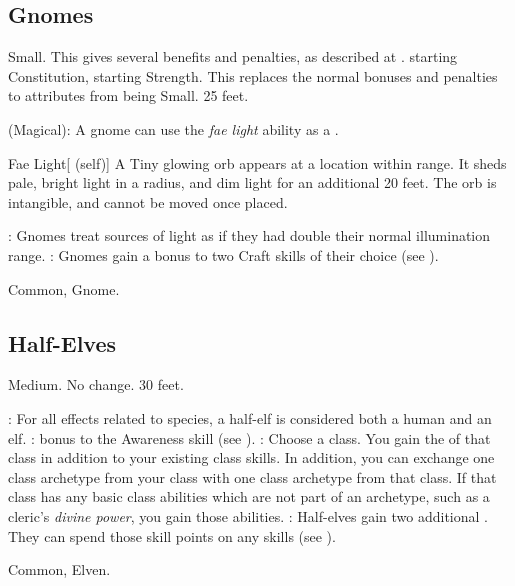 \subsection{Gnomes}
 Small. This gives several benefits and penalties, as described at .
  starting Constitution,  starting Strength. This replaces the normal bonuses and penalties to attributes from being Small.
 25 feet.
\begin{itemize}
     (Magical): A gnome can use the \textit{fae light} ability as a .
        \begin{attuneability}{Fae Light}[ (self)]
            A Tiny glowing orb appears at a location within \rngmed range.
            It sheds pale, bright light in a \areamed radius, and dim light for an additional 20 feet.
            The orb is intangible, and cannot be moved once placed.
        \end{attuneability}
    : Gnomes treat sources of light as if they had double their normal illumination range.
    : Gnomes gain a  bonus to two Craft skills of their choice (see ).
\end{itemize}
 Common, Gnome.

\subsection{Half-Elves}\label{Half-Elves}
 Medium.
 No change.
 30 feet.
\begin{itemize}
    : For all effects related to species, a half-elf is considered both a human and an elf.
    :  bonus to the Awareness skill (see ).
    : Choose a class.
        You gain the  of that class in addition to your existing class skills.
        In addition, you can exchange one class archetype from your class with one class archetype from that class.
        If that class has any basic class abilities which are not part of an archetype, such as a cleric's \textit{divine power}, you gain those abilities.
    : Half-elves gain two additional . They can spend those skill points on any skills (see ).
\end{itemize}
 Common, Elven.


